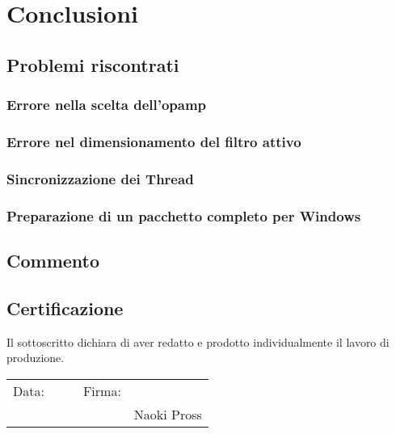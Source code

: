 \chapter{Conclusioni}
\section{Problemi riscontrati}
\subsection{Errore nella scelta dell'opamp}
\subsection{Errore nel dimensionamento del filtro attivo} \label{sec:err-filter}
\subsection{Sincronizzazione dei Thread}
\subsection{Preparazione di un pacchetto completo per Windows}

\section{Commento}
\section{Certificazione}
Il sottoscritto dichiara di aver redatto e prodotto individualmente il lavoro
di produzione.
\begin{flushright}
\begin{tabular}{ r p{5cm} p{1cm} r p{5cm}}
    Data: & \hrulefill && Firma: & \hrulefill \\
    &&&& Naoki Pross \\
\end{tabular}
\end{flushright}
